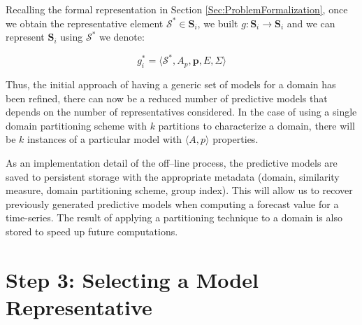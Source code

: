 Recalling the formal representation in Section \ref{Sec:ProblemFormalization}, once we obtain the representative element $\mathcal{S}^{*} \in \mathbf{S}_{i}$, we built $g:\mathbf{S}_{i} \to \mathbf{S}_{i}$ and we can represent $\mathbf{S}_{i}$ using $\mathcal{S}^{*}$ we denote:

\begin{equation}
g^{*}_{i} = \langle \mathcal{S}^{*}, A_p, \mathbf{p}, E, \varSigma \rangle
\end{equation}

Thus, the initial approach of having a generic set of models for a domain has been refined, there can now be a reduced number of predictive models that depends on the number of representatives considered. In the case of using a single domain partitioning scheme with $k$ partitions to characterize a domain, there will be $k$ instances of a particular model with $\langle A, p \rangle$ properties. 

As an implementation detail of the off--line process, the predictive models are saved to persistent storage with the appropriate metadata (domain, similarity measure, domain partitioning scheme, group index). This will allow us to recover previously generated predictive models when computing a forecast value for a time-series. The result of applying a partitioning technique to a domain is also stored to speed up future computations.

\section{Step 3: Selecting a Model Representative}
\label{Sec:KnowledgExtraction}

